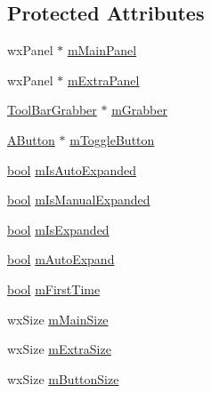 \subsection*{Protected Attributes}
\begin{DoxyCompactItemize}
\item 
wx\+Panel $\ast$ \hyperlink{class_expanding_tool_bar_ad37026b2559dd320a0d6322208432d8e}{m\+Main\+Panel}
\item 
wx\+Panel $\ast$ \hyperlink{class_expanding_tool_bar_a9979210c154105c6648ef735bc743571}{m\+Extra\+Panel}
\item 
\hyperlink{class_tool_bar_grabber}{Tool\+Bar\+Grabber} $\ast$ \hyperlink{class_expanding_tool_bar_aa106c202a97c223e99ea76474a62d8e9}{m\+Grabber}
\item 
\hyperlink{class_a_button}{A\+Button} $\ast$ \hyperlink{class_expanding_tool_bar_ac00f7ae38ce9f5d7a98bd13f3af748bc}{m\+Toggle\+Button}
\item 
\hyperlink{mac_2config_2i386_2lib-src_2libsoxr_2soxr-config_8h_abb452686968e48b67397da5f97445f5b}{bool} \hyperlink{class_expanding_tool_bar_ad2ce29d98f22f0a5718cfc63cae5100c}{m\+Is\+Auto\+Expanded}
\item 
\hyperlink{mac_2config_2i386_2lib-src_2libsoxr_2soxr-config_8h_abb452686968e48b67397da5f97445f5b}{bool} \hyperlink{class_expanding_tool_bar_af12c9e75db7c0a164a6d7d0ae62f3c66}{m\+Is\+Manual\+Expanded}
\item 
\hyperlink{mac_2config_2i386_2lib-src_2libsoxr_2soxr-config_8h_abb452686968e48b67397da5f97445f5b}{bool} \hyperlink{class_expanding_tool_bar_a644f8d5fc1f00d8d997093a7dedc873d}{m\+Is\+Expanded}
\item 
\hyperlink{mac_2config_2i386_2lib-src_2libsoxr_2soxr-config_8h_abb452686968e48b67397da5f97445f5b}{bool} \hyperlink{class_expanding_tool_bar_a328da4105eaf5e813a93a3c03649c618}{m\+Auto\+Expand}
\item 
\hyperlink{mac_2config_2i386_2lib-src_2libsoxr_2soxr-config_8h_abb452686968e48b67397da5f97445f5b}{bool} \hyperlink{class_expanding_tool_bar_abf2e0565c515d7a11c6e34ed2a3910e3}{m\+First\+Time}
\item 
wx\+Size \hyperlink{class_expanding_tool_bar_a1738e0c37ba427d1bada3307ecc346a4}{m\+Main\+Size}
\item 
wx\+Size \hyperlink{class_expanding_tool_bar_acad47137830e2ea37de5564b146a3fe0}{m\+Extra\+Size}
\item 
wx\+Size \hyperlink{class_expanding_tool_bar_a886f2d113ee6ba34fbca0644c93f2664}{m\+Button\+Size}
\item 

\end{DoxyCompactItemize}
